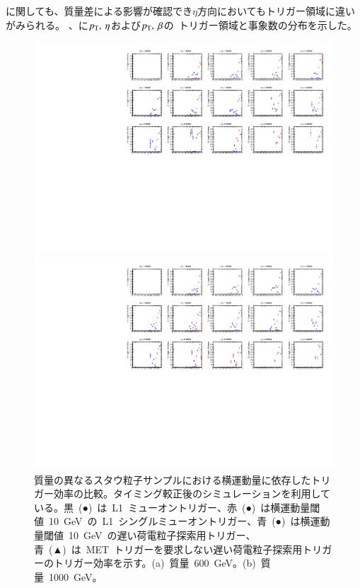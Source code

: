 に関しても、質量差による影響が確認でき$\eta$方向においてもトリガー領域に違いがみられる。
、に$p_{\rm{T}},~\eta$および$p_{\rm{T}},~\beta$の~トリガー領域と事象数の分布を示した。
\begin{figure}[H]
    \begin{minipage}{0.49\hsize}
    \centering   
    \includegraphics[width=\textwidth,page=4]{img/rec/stau_600.pdf}
    \subcaption{}
    \end{minipage}
    \begin{minipage}{0.49\hsize}
    \centering   
    \includegraphics[width=\textwidth,page=4]{img/rec/stau_1000.pdf}
    \subcaption{}
    \end{minipage}
    \caption[質量の異なるスタウ粒子サンプルにおける横運動量に依存したトリガー効率の比較]{質量の異なるスタウ粒子サンプルにおける横運動量に依存したトリガー効率の比較。タイミング較正後のシミュレーションを利用している。黒~(●)~は~L1~ミューオントリガー、赤~(●)~は横運動量閾値~10~GeV~の~L1~シングルミューオントリガー、青~(●)~は横運動量閾値~10~GeV~の遅い荷電粒子探索用トリガー、青~(▲)~は~MET~トリガーを要求しない遅い荷電粒子探索用トリガーのトリガー効率を示す。(a)~質量~600~GeV。(b)~質量~1000~GeV。}\label{fig:tript6}
\end{figure}
